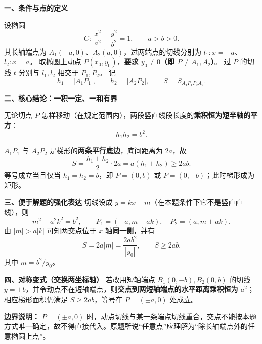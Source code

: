 \begin{statementbox}
\textbf{\textcolor{CStatement}{一、条件与点的定义}}

设椭圆
\[
C:\ \frac{x^2}{a^2}+\frac{y^2}{b^2}=1,\qquad a>b>0.
\]
其长轴端点为 $A_1(-a,0)$、$A_2(a,0)$，过两端点的切线分别为 $l_1:x=-a$、$l_2:x=a$。
取椭圆上动点 $P(x_0,y_0)$，\textbf{要求 $y_0\ne0$（即 $P\ne A_1,A_2$）}。
过 $P$ 的切线 $t$ 分别与 $l_1,l_2$ 相交于 $P_1,P_2$。
记
\[
h_1=|A_1P_1|,\qquad h_2=|A_2P_2|,\qquad
S=S_{A_1P_1P_2A_2}.
\]

\medskip
\textbf{\textcolor{CStatement}{二、核心结论：一积一定、一和有界}}
\begin{description}[style=nextline,leftmargin=2.8em,labelsep=0.5em,itemsep=0.5em]
\item[\textbf{结论 1（定值乘积）：}]
无论切点 $P$ 怎样移动（在规定范围内），两段竖直线段长度的\textbf{乘积恒为短半轴的平方}：
\[
\boxed{h_1h_2=b^2.}
\]
\item[\textbf{结论 2（面积最小）：}]
$A_1P_1$ 与 $A_2P_2$ 是梯形的\textbf{两条平行底边}，底间距离为 $2a$，故
\[
S=\frac{h_1+h_2}{2}\cdot 2a=a(h_1+h_2)
\ge\boxed{2ab}.
\]
等号成立当且仅当 $h_1=h_2=b$，即 $P=(0,b)$ 或 $P=(0,-b)$；此时梯形成为矩形。
\end{description}

\medskip
\textbf{\textcolor{CStatement}{三、便于解题的强化表达}}
切线设成 $y=kx+m$（在本题条件下它不是竖直直线），则
\[
\boxed{m^2-a^2k^2=b^2},\qquad
P_1=(-a,m-ak),\quad P_2=(a,m+ak).
\]
由 $|m|>a|k|$ 可知两交点位于 $x$ 轴\textbf{同一侧}，并有
\[
\boxed{S=2a|m|=\frac{2ab^2}{|y_0|}},\qquad
\boxed{S\ge2ab}. 
\]
其中 $m=b^2/y_0$。

\medskip
\textbf{\textcolor{CStatement}{四、对称变式（交换两坐标轴）}}
若改用短轴端点 $B_1(0,-b),B_2(0,b)$ 的切线 $y=\pm b$，并令动点不在短轴端点，则\textbf{交点到两短轴端点的水平距离乘积恒为 $a^2$}；相应梯形面积仍满足 $S\ge2ab$，等号在 $P=(\pm a,0)$ 处成立。

\medskip
\textbf{\textcolor{CStatement}{边界说明：}}
$P=(\pm a,0)$ 时，动点切线与某一条端点切线重合，交点不能按本题方式唯一确定，故不得直接代入。原题所说“任意点”应理解为“除长轴端点外的任意椭圆上点”。
\end{statementbox}
